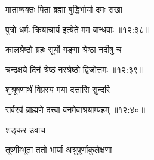{\devanagarifont माताव्यक्तः पिता ब्रह्मा बुद्धिर्भार्या दमः सखा \thinspace{\dandab} \dontdisplaylinenum }%


{\devanagarifont पुत्रो धर्मः क्रियाचार्य इत्येते मम बान्धवाः {॥१२:३८॥} \veg\dontdisplaylinenum }%
 
{\devanagarifont कालश्रेष्ठो ग्रहः सूर्यो गङ्गा श्रेष्ठा नदीषु च \thinspace{\dandab} \dontdisplaylinenum }%


{\devanagarifont चन्द्रक्षये दिनं श्रेष्ठं नरश्रेष्ठो द्विजोत्तमः {॥१२:३९॥} \veg\dontdisplaylinenum }%

{\devanagarifont शुश्रूषणार्थं विप्रस्य मया दत्तासि सुन्दरि \thinspace{\dandab} \dontdisplaylinenum }%


{\devanagarifont सर्वस्वं ब्राह्मणे दत्त्वा वनमेवाश्रयाम्यहम् {॥१२:४०॥} \veg\dontdisplaylinenum }%
 
{\devanagarifont शङ्कर उवाच {\dandab}\dontdisplaylinenum  }%

{\devanagarifont तूष्णीम्भूता ततो भार्या अश्रुपूर्णाकुलेक्षणा \thinspace{\danda} \dontdisplaylinenum }%

